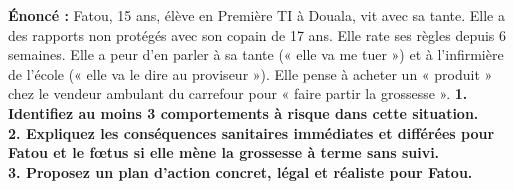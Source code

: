 \documentclass[11pt]{article}
\begin{document}
\begin{exoresolu}
\textbf{Énoncé :} Fatou, 15 ans, élève en Première TI à Douala, vit avec sa tante. Elle a des rapports non protégés avec son copain de 17 ans. Elle rate ses règles depuis 6 semaines. Elle a peur d'en parler à sa tante (« elle va me tuer ») et à l'infirmière de l'école (« elle va le dire au proviseur »). Elle pense à acheter un « produit » chez le vendeur ambulant du carrefour pour « faire partir la grossesse ».
\textbf{1. Identifiez au moins 3 comportements à risque dans cette situation.}\\
\textbf{2. Expliquez les conséquences sanitaires immédiates et différées pour Fatou et le fœtus si elle mène la grossesse à terme sans suivi.}\\
\textbf{3. Proposez un plan d'action concret, légal et réaliste pour Fatou.}


\end{exoresolu}
\end{document}
